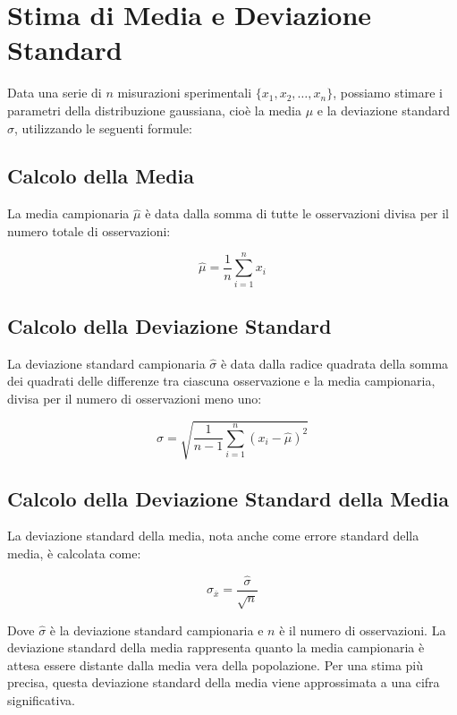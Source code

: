 \documentclass[a4paper,12pt]{article}
\begin{document}
\section{Stima di Media e Deviazione Standard}
Data una serie di $n$ misurazioni sperimentali $\{x_1, x_2, \ldots, x_n\}$, possiamo stimare i parametri della distribuzione gaussiana, cioè la media $\mu$ e la deviazione standard $\sigma$, utilizzando le seguenti formule:

\subsection{Calcolo della Media}
La media campionaria $\hat{\mu}$ è data dalla somma di tutte le osservazioni divisa per il numero totale di osservazioni:

\begin{equation}
\hat{\mu} = \frac{1}{n} \sum_{i=1}^{n} x_i
\end{equation}

\subsection{Calcolo della Deviazione Standard}
La deviazione standard campionaria $\hat{\sigma}$ è data dalla radice quadrata della somma dei quadrati delle differenze tra ciascuna osservazione e la media campionaria, divisa per il numero di osservazioni meno uno:

\begin{equation}
\hat{\sigma} = \sqrt{\frac{1}{n-1} \sum_{i=1}^{n} (x_i - \hat{\mu})^2}
\end{equation}

\subsection{Calcolo della Deviazione Standard della Media}
La deviazione standard della media, nota anche come errore standard della media, è calcolata come:

\begin{equation}
\sigma_{\overline{x}} = \frac{\hat{\sigma}}{\sqrt{n}}
\end{equation}

Dove $\hat{\sigma}$ è la deviazione standard campionaria e $n$ è il numero di osservazioni. La deviazione standard della media rappresenta quanto la media campionaria è attesa essere distante dalla media vera della popolazione. Per una stima più precisa, questa deviazione standard della media viene approssimata a una cifra significativa.
\end{document}

